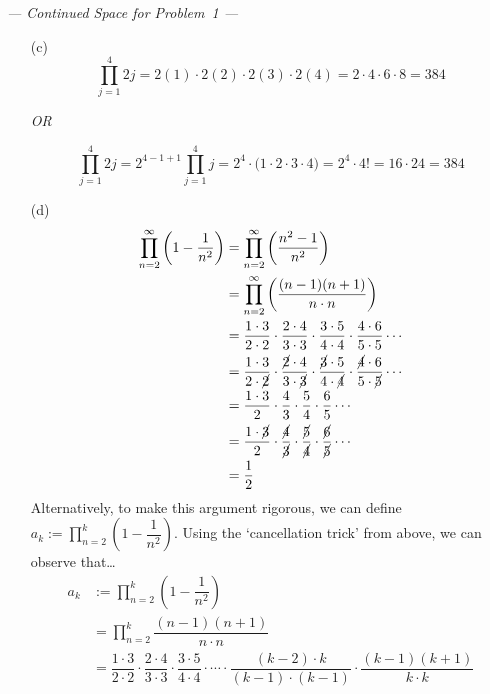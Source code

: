\documentclass[11pt,letterpaper]{article}
\begin{document}
\newpage 
\begin{center} {\itshape --- Continued Space for Problem~1 ---} \end{center} \pspace

\begin{enumerate}
\item[(c)] 
	\[
	\prod_{j=1}^4 2j= 2(1) \cdot 2(2) \cdot 2(3) \cdot 2(4)= 2 \cdot 4 \cdot 6 \cdot 8= 384
	\]
		\begin{center} {\itshape OR} \end{center}
	\[
	\prod_{j=1}^4 2j= 2^{4 - 1 + 1} \prod_{j=1}^4 j= 2^4 \cdot \big( 1 \cdot 2 \cdot 3 \cdot 4 \big)= 2^4 \cdot 4!= 16 \cdot 24= 384
	\] \pspace

\item[(d)] 
	\[
	\begin{aligned}
	\prod_{n=2}^\infty \left(1 - \dfrac{1}{n^2} \right)&= \prod_{n=2}^\infty \left( \dfrac{n^2 - 1}{n^2} \right) \\
	&= \prod_{n=2}^\infty \left( \dfrac{(n - 1)(n + 1)}{n \cdot n} \right) \\
	&= \dfrac{1 \cdot 3}{2 \cdot 2} \cdot \dfrac{2 \cdot 4}{3 \cdot 3} \cdot \dfrac{3 \cdot 5}{4 \cdot 4} \cdot \dfrac{4 \cdot 6}{5 \cdot 5} \cdots \\
	&= \dfrac{1 \cdot 3}{2 \cdot \cancel{2}} \cdot \dfrac{\cancel{2} \cdot 4}{3 \cdot \cancel{3}} \cdot \dfrac{\cancel{3} \cdot 5}{4 \cdot \cancel{4}} \cdot \dfrac{\cancel{4} \cdot 6}{5 \cdot \cancel{5}} \cdots \\
	&= \dfrac{1 \cdot 3}{2} \cdot \dfrac{4}{3} \cdot \dfrac{5}{4} \cdot \dfrac{6}{5} \cdots \\
	&= \dfrac{1 \cdot \cancel{3}}{2} \cdot \dfrac{\cancel{4}}{\cancel{3}} \cdot \dfrac{\cancel{5}}{\cancel{4}} \cdot \dfrac{\cancel{6}}{\cancel{5}} \cdots \\
	&= \dfrac{1}{2}
	\end{aligned}
	\]
Alternatively, to make this argument rigorous, we can define $\displaystyle a_k:= \prod_{n=2}^k \left(1 - \dfrac{1}{n^2} \right)$. Using the `cancellation trick' from above, we can observe that\dots
	\[
	\begin{aligned}
	a_k&:= \prod_{n=2}^k \left(1 - \dfrac{1}{n^2} \right) \\
	&= \prod_{n=2}^k \dfrac{(n - 1)(n + 1)}{n \cdot n} \\
	&= \dfrac{1 \cdot 3}{2 \cdot 2} \cdot \dfrac{2 \cdot 4}{3 \cdot 3} \cdot \dfrac{3 \cdot 5}{4 \cdot 4} \cdot \cdots \cdot \dfrac{(k - 2) \cdot k}{(k -1) \cdot (k - 1)} \cdot \dfrac{(k - 1)(k + 1)}{k \cdot k} \\

\end{aligned}\]
\end{enumerate}
\end{document}
